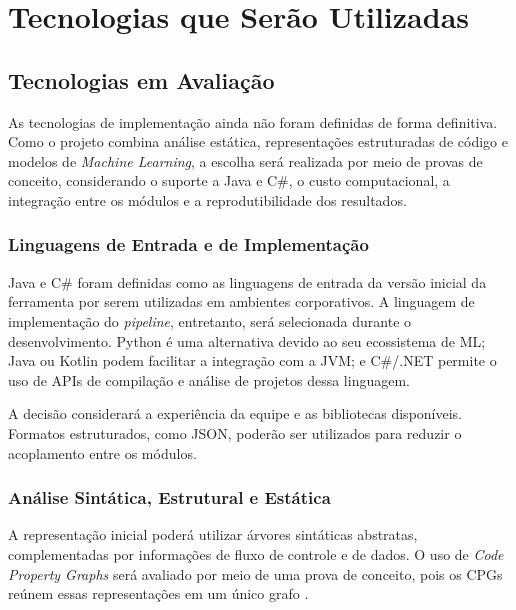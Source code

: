 \chapter{Tecnologias que Serão Utilizadas}
\label{cap:tecnologias}


\section{Tecnologias em Avaliação}

As tecnologias de implementação ainda não foram definidas de forma
definitiva. Como o projeto combina análise estática, representações
estruturadas de código e modelos de \textit{Machine Learning}, a escolha
será realizada por meio de provas de conceito, considerando o suporte a
Java e C\#, o custo computacional, a integração entre os módulos e a
reprodutibilidade dos resultados.

\subsection{Linguagens de Entrada e de Implementação}

Java e C\# foram definidas como as linguagens de entrada da versão inicial
da ferramenta por serem utilizadas em ambientes corporativos. A linguagem
de implementação do \textit{pipeline}, entretanto, será selecionada durante
o desenvolvimento. Python é uma alternativa devido ao seu ecossistema de
ML; Java ou Kotlin podem facilitar a integração com a JVM; e C\#/.NET
permite o uso de APIs de compilação e análise de projetos dessa linguagem.

A decisão considerará a experiência da equipe e as bibliotecas disponíveis.
Formatos estruturados, como JSON, poderão ser utilizados para reduzir o
acoplamento entre os módulos.

\subsection{Análise Sintática, Estrutural e Estática}

A representação inicial poderá utilizar árvores sintáticas abstratas,
complementadas por informações de fluxo de controle e de dados. O uso de
\textit{Code Property Graphs} será avaliado por meio de uma prova de
conceito, pois os CPGs reúnem essas representações em um único grafo
\cite{yamaguchi2014cpg}.

